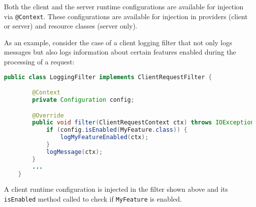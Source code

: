 Both the client and the server runtime configurations are available for injection via \lstinline{@Context}. These
configurations are available for injection in providers (client or server) and resource classes (server only).

As an example, consider the case of a client logging filter that not only logs messages but also logs information about
certain features enabled during the processing of a request:

\begin{lstlisting}[language=Java]
    public class LoggingFilter implements ClientRequestFilter {

        @Context
        private Configuration config;

        @Override
        public void filter(ClientRequestContext ctx) throws IOException {
            if (config.isEnabled(MyFeature.class)) {
                logMyFeatureEnabled(ctx);
            }
            logMessage(ctx);
        }
        ...
    }
\end{lstlisting}

A client runtime configuration is injected in the filter shown above and its \lstinline{isEnabled} method called to
check if \lstinline{MyFeature} is enabled.
